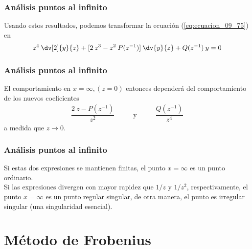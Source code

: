 \begin{frame}
\frametitle{Análisis puntos al infinito}
Usando estos resultados, podemos transformar la ecuación (\ref{eq:ecuacion_09_75}) en
\begin{align}
z^{4} \: \dv[2]{y}{z} + [ 2 \: z^{3} - z^{2} \: P(z^{-1})] \: \dv{y}{z} + Q(z^{-1}) \: y = 0
\label{eq:ecuacion_09_78}
\end{align}
\end{frame}
\begin{frame}
\frametitle{Análisis puntos al infinito}
El comportamiento en $x = \infty, (z = 0)$ entonces dependerá del comportamiento de los nuevos coeficientes
\begin{align*}
\dfrac{2 \: z - P(z^{-1})}{z^{2}} \hspace{1cm} \text{ y } \hspace{1cm} \dfrac{Q(z^{-1})}{z^{4}}
\end{align*}
a medida que $z \to 0$.
\end{frame}
\begin{frame}
\frametitle{Análisis puntos al infinito}
Si estas dos expresiones se mantienen finitas, el punto $x = \infty$ es un punto ordinario.
\\
\bigskip
Si las expresiones divergen con mayor rapidez que $1/z$ y $1/z^{2}$, respectivamente, el punto $x = \infty$ es un punto regular singular, de otra manera, el punto es irregular singular (una singularidad esencial).
\end{frame}
\section{Método de Frobenius}
